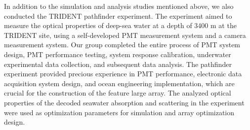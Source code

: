 \begin{eabstract}
In addition to the simulation and analysis studies mentioned above, we also conducted the TRIDENT pathfinder experiment. The experiment aimed to measure the optical properties of deep-sea water at a depth of 3400 m at the TRIDENT site, using a self-developed PMT measurement system and a camera measurement system. Our group completed the entire process of PMT system design, PMT performance testing, system response calibration, underwater experimental data collection, and subsequent data analysis. The pathfinder experiment provided precious experience in PMT performance, electronic data acquisition system design, and ocean engineering implementation, which are crucial for the construction of the feature large array. The analyzed optical properties of the decoded seawater absorption and scattering in the experiment were used as optimization parameters for simulation and array optimization design.


\end{eabstract}


